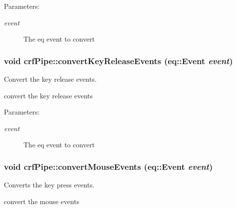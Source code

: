 \begin{Desc}
\item[Parameters:]
\begin{description}
\item[{\em event}]The eq event to convert \end{description}
\end{Desc}
\hypertarget{a00006_9e4c676e2d880a7149d61c13f2e34f73}{
\subsubsection[{convertKeyReleaseEvents}]{\setlength{\rightskip}{0pt plus 5cm}void crfPipe::convertKeyReleaseEvents (eq::Event {\em event})}}
\label{a00006_9e4c676e2d880a7149d61c13f2e34f73}


Convert the key release events. 

convert the key release events

\begin{Desc}
\item[Parameters:]
\begin{description}
\item[{\em event}]The eq event to convert \end{description}
\end{Desc}
\hypertarget{a00006_bdce51a794891a4b0caa3f33ba6e7ab4}{
\subsubsection[{convertMouseEvents}]{\setlength{\rightskip}{0pt plus 5cm}void crfPipe::convertMouseEvents (eq::Event {\em event})}}
\label{a00006_bdce51a794891a4b0caa3f33ba6e7ab4}


Converts the key press events. 

convert the mouse events


